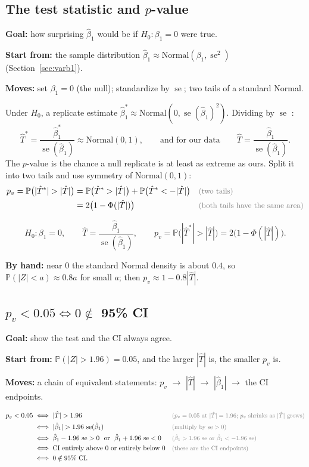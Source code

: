 \documentclass[11pt]{article}
\newcommand{\se}{\operatorname{se}}
\renewcommand{\P}{\mathbb{P}}
\newcommand{\Norm}{\text{Normal}}
\newcommand{\why}[1]{&&\text{\small\color{gray}(#1)}}
\newcommand{\mv}[1]{\tcbox[on line, colback=methodclr, colframe=methodclr, coltext=white, boxsep=0pt,
  left=2pt, right=2pt, top=1pt, bottom=1pt, arc=1.5pt]{\sffamily\scriptsize\bfseries M#1}}
\newcommand{\goal}[1]{\textbf{Goal:} #1\par}
\newcommand{\start}[1]{\textbf{Start from:} #1\par}
\newcommand{\moves}[1]{\textbf{Moves:} #1\par}
\begin{document}
\subsection{The test statistic and $p$-value}\label{sec:test}
\begin{methodbox}
\goal{how surprising $\hat\beta_1$ would be if $H_0:\beta_1=0$ were true.}
\start{the sample distribution $\hat\beta_1\approx\Norm(\beta_1,\se^2)$ (Section~\ref{sec:varb1}).}
\moves{set $\beta_1=0$ (the null); \mv{6} standardize by $\se$; \mv{9} two tails of a standard Normal.}
\end{methodbox}
Under $H_0$, a replicate estimate $\hat\beta_1^*\approx\Norm(0,\se(\hat\beta_1)^2)$. Dividing by $\se$ \mv{6}:
\[
\hat T^*=\frac{\hat\beta_1^*}{\se(\hat\beta_1)}\approx\Norm(0,1),\qquad\text{and for our data}\qquad \hat T=\frac{\hat\beta_1}{\se(\hat\beta_1)} .
\]
The $p$-value is the chance a null replicate is at least as extreme as ours. Split it into two tails and use symmetry of $\Norm(0,1)$:
\begin{align*}
p_v=\P\big(|\hat T^*|>|\hat T|\big)&=\P\big(\hat T^*>|\hat T|\big)+\P\big(\hat T^*<-|\hat T|\big) \why{two tails}\\
&=2\big(1-\Phi(|\hat T|)\big) \why{both tails have the same area}
\end{align*}
\begin{keybox}
\[H_0:\beta_1=0,\qquad \hat T=\frac{\hat\beta_1}{\se(\hat\beta_1)},\qquad p_v=\P\big(|\hat T^*|>|\hat T|\big)=2\big(1-\Phi(|\hat T|)\big).\]
\end{keybox}
\textbf{By hand:} near $0$ the standard Normal density is about $0.4$, so $\P(|Z|<a)\approx0.8a$ for small $a$; then $p_v\approx1-0.8|\hat T|$.

\subsection{$p_v<0.05\iff0\notin$ 95\% CI}\label{sec:ci-test}
\begin{methodbox}
\goal{show the test and the CI always agree.}
\start{$\P(|Z|>1.96)=0.05$, and the larger $|\hat T|$ is, the smaller $p_v$ is.}
\moves{a chain of equivalent statements: $p_v$ $\to$ $|\hat T|$ $\to$ $|\hat\beta_1|$ $\to$ the CI endpoints.}
\end{methodbox}
\begin{align*}
p_v<0.05
&\iff|\hat T|>1.96 \why{$p_v=0.05$ at $|\hat T|=1.96$; $p_v$ shrinks as $|\hat T|$ grows}\\
&\iff|\hat\beta_1|>1.96\,\se(\hat\beta_1) \why{multiply by $\se>0$}\\
&\iff\hat\beta_1-1.96\,\se>0\ \text{ or }\ \hat\beta_1+1.96\,\se<0 \why{$\hat\beta_1>1.96\,\se$ or $\hat\beta_1<-1.96\,\se$}\\
&\iff\text{CI entirely above 0 or entirely below 0} \why{these are the CI endpoints}\\
&\iff0\notin\text{95\% CI}.
\end{align*}
\end{document}
